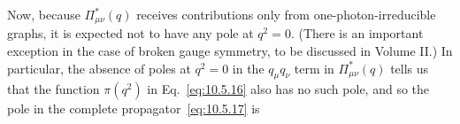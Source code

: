 Now, because $\Pi^*_{\mu\nu}(q)$ receives contributions only from
one-photon-irreducible graphs, it is expected not to have any pole at $q^2=0$.
(There is an important exception in the case of broken gauge symmetry, to be
discussed in Volume II.) In particular, the absence of poles at $q^2=0$ in the
$q_\mu q_\nu$ term in $\Pi^*_{\mu\nu}(q)$ tells us that the function
$\pi(q^2)$ in Eq.~\eqref{eq:10.5.16} also has no such pole, and so the pole in
the complete propagator~\eqref{eq:10.5.17} is
